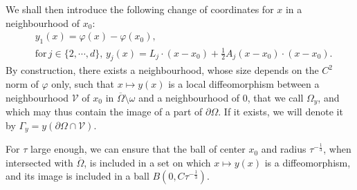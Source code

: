 \documentclass[10pt]{amsart}
\theoremstyle{definition}\newtheorem{defi}[theo]{Definition}\newtheorem{rema}[theo]{Remark}\newtheorem{exam}[theo]{Example}\newtheorem{exem}[theo]{Example}\newtheorem{nota}[theo]{Notation}
\newcommand{\clV}{\mathcal{V}}
\begin{document}
We shall then introduce the following change of coordinates for $x$ in a neighbourhood of $x_0$:
\begin{align*}
& y_1(x) = \varphi(x)- \varphi(x_0),
\\
& \text{for} \, j \in \{2, \cdots, d\},
\, y_j(x) = L_j \cdot (x-x_0) + \frac{1}{2} A_j (x-x_0) \cdot (x-x_0).
\end{align*}
By construction, there exists a neighbourhood, whose size depends on the $C^2$ norm of $\varphi$ only, such that $x \mapsto y(x)$ is a local diffeomorphism between a neighbourhood $\clV$ of $x_0$ in $\overline\Omega\setminus \omega$ and a neighbourhood of $0$, that we call $\Omega_y$, and which may thus contain the image of a part of $\partial \Omega$. If it exists, we will denote it by $\Gamma_y = y(\partial \Omega \cap \clV)$.

For $\tau$ large enough, we can ensure that the ball of center $x_0$ and radius $\tau^{-\frac{1}{3}}$, when intersected with $\overline\Omega$, is included in a set on which $x \mapsto y(x)$ is a diffeomorphism, and its image is included in a ball $B(0, C \tau^{-\frac{1}{3}})$.
\end{document}
